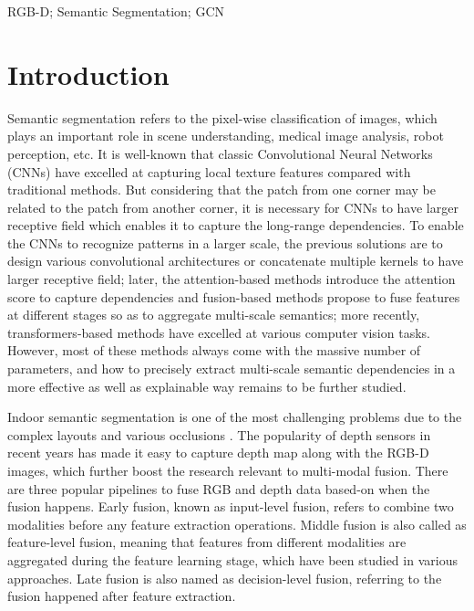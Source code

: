﻿\documentclass[journal]{IEEEtran}
\begin{document}
\begin{IEEEkeywords}
    RGB-D; Semantic Segmentation; GCN
    \end{IEEEkeywords}


\section{Introduction} \label{sec_introduction}
 
    Semantic segmentation refers to the pixel-wise classification of images, which plays an important role in scene understanding, medical image analysis, robot perception, etc\cite{mo2022review}. It is well-known that classic Convolutional Neural Networks (CNNs) have excelled at capturing local texture features compared with traditional methods. But considering that the patch from one corner may be related to the patch from another corner, it is necessary for CNNs to have larger receptive field which enables it to capture the long-range dependencies. To enable the CNNs to recognize patterns in a larger scale, the previous solutions are to design various convolutional architectures \cite{wei2018dilated} or concatenate multiple kernels \cite{simonyan2014vgg} to have larger receptive field; later, the attention-based methods \cite{hu2018seNet} \cite{wang2018nonLocal} introduce the attention score to capture dependencies and fusion-based methods \cite{yuan2020OCrep} \cite{li2020gatedfuse} propose to fuse features at different stages so as to aggregate multi-scale semantics; more recently, transformers-based methods \cite{carion2020DETR}\cite{dosovitskiy2020ViT} have excelled at various computer vision tasks. However, most of these methods always come with the massive number of parameters, and how to precisely extract multi-scale semantic dependencies in a more effective as well as explainable way remains to be further studied. 
    
    Indoor semantic segmentation is one of the most challenging problems due to the complex layouts and various occlusions \cite{wang2021brief}. The popularity of depth sensors in recent years has made it easy to capture depth map along with the RGB-D images, which further boost the research relevant to multi-modal fusion. There are three popular pipelines to fuse RGB and depth data based-on when the fusion happens. Early fusion, known as input-level fusion, refers to combine two modalities before any feature extraction operations. Middle fusion is also called as feature-level fusion, meaning that features from different modalities are aggregated during the feature learning stage, which have been studied in various approaches. Late fusion is also named as decision-level fusion, referring to the fusion happened after feature extraction. 
\end{document}
